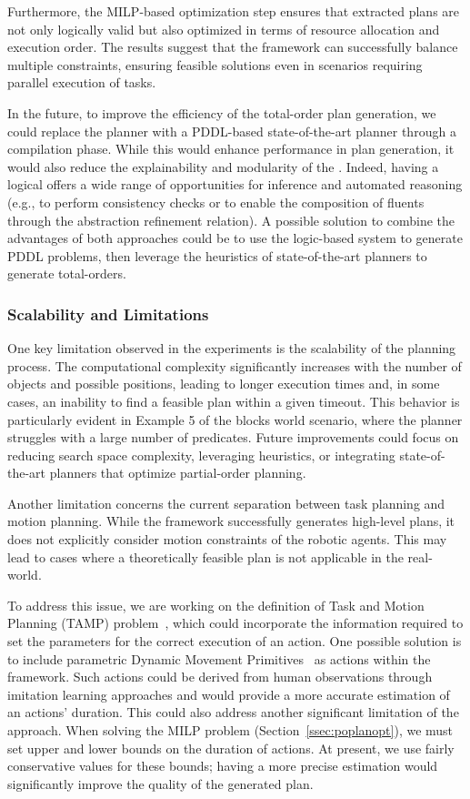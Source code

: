 Furthermore, the MILP-based optimization step ensures that extracted plans are not only logically valid but also optimized in terms of resource allocation and execution order. The results suggest that the framework can successfully balance multiple constraints, ensuring feasible solutions even in scenarios requiring parallel execution of tasks.

In the future, to improve the efficiency of the total-order plan generation, 
we could replace the planner with a PDDL-based state-of-the-art 
planner through a compilation phase. While this would enhance 
performance in plan generation, it would also reduce the 
explainability and modularity of the \kb. Indeed, having a logical 
\kb offers a wide range of opportunities for inference 
and automated reasoning (e.g., to perform consistency checks or 
to enable the composition of fluents through the abstraction refinement 
relation).  
A possible solution to combine the advantages of both 
approaches could be to use the logic-based system to generate PDDL problems, 
then leverage the heuristics of state-of-the-art planners to 
generate total-orders. 

\subsubsection{Scalability and Limitations}
One key limitation observed in the experiments is the scalability of the planning process. The computational complexity significantly increases with the number of objects and possible positions, leading to longer execution times and, in some cases, an inability to find a feasible plan within a given timeout. This behavior is particularly evident in Example 5 of the blocks world scenario, where the planner struggles with a large number of predicates. Future improvements could focus on reducing search space complexity, leveraging heuristics, or integrating state-of-the-art planners that optimize partial-order planning.

Another limitation concerns the current separation between task planning and motion planning. While the framework successfully generates high-level plans, it does not explicitly consider motion constraints of the robotic agents. This may lead to cases where a theoretically feasible plan is not applicable in the real-world. 

To address this issue,  
we are working on the definition of Task and Motion Planning (TAMP) 
problem~\cite{tampsurvey}, which could incorporate 
the information required to set the parameters for the 
correct execution of an action. One possible solution 
is to include parametric Dynamic Movement 
Primitives~\cite{DMPsurvey} as actions within the framework.  
Such actions could be derived from human observations through 
imitation learning approaches and would provide a more accurate 
estimation of an actions' duration. This could also address another significant 
limitation of the approach.  
When solving the MILP problem (Section~\ref{ssec:poplanopt}), we must 
set upper and lower bounds on the duration of actions. At 
present, we use fairly conservative values for these bounds; having 
a more precise estimation would significantly improve the quality of the generated plan.  

